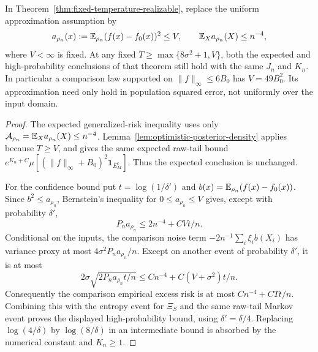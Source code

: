 \begin{corollary}
\label{cor:fixed-temperature-population}
In Theorem~\ref{thm:fixed-temperature-realizable}, replace the uniform
approximation assumption by
\[
 a_{\rho_n}(x):=\mathbb E_{\rho_n}(f(x)-f_0(x))^2\le V,
 \qquad \mathbb E_X a_{\rho_n}(X)\le n^{-4},
\]
where $V<\infty$ is fixed. At any fixed
$T\ge\max\{8\sigma^2+1,V\}$, both the expected and high-probability
conclusions of that theorem still hold with the same $J_n$ and $K_n$.
In particular a comparison law supported on $\|f\|_\infty\le6B_0$
has $V=49B_0^2$. Its approximation need only hold in population squared
error, not uniformly over the input domain.
\end{corollary}
\begin{proof}
The expected generalized-risk inequality uses only
$\mathcal A_{\rho_n}=\mathbb E_Xa_{\rho_n}(X)\le n^{-4}$.
Lemma~\ref{lem:optimistic-posterior-density} applies because $T\ge V$,
and gives the same expected raw-tail bound
$e^{K_n+C}\mu[(\|f\|_\infty+B_0)^2\mathbf1_{E_M^c}]$.
Thus the expected conclusion is unchanged.

For the confidence bound put $t=\log(1/\delta')$ and
$b(x)=\mathbb E_{\rho_n}(f(x)-f_0(x))$. Since $b^2\le a_{\rho_n}$,
Bernstein's inequality for $0\le a_{\rho_n}\le V$ gives, except with
probability $\delta'$,
\[
 P_na_{\rho_n}\le2n^{-4}+C Vt/n.
\]
Conditional on the inputs, the comparison noise term
$-2n^{-1}\sum_i\xi_i b(X_i)$ has variance proxy at most
$4\sigma^2 P_na_{\rho_n}/n$. Except on another event of probability
$\delta'$, it is at most
\[
 2\sigma\sqrt{2P_na_{\rho_n}t/n}
       \le Cn^{-4}+C(V+\sigma^2)t/n.
\]
Consequently the comparison empirical excess risk is at most
$Cn^{-4}+CTt/n$. Combining this with the entropy event for $\Xi_S$
and the same raw-tail Markov event proves the displayed
high-probability bound, using $\delta'=\delta/4$. Replacing
$\log(4/\delta)$ by $\log(8/\delta)$ in an intermediate bound is
absorbed by the numerical constant and $K_n\ge1$.
\end{proof}
